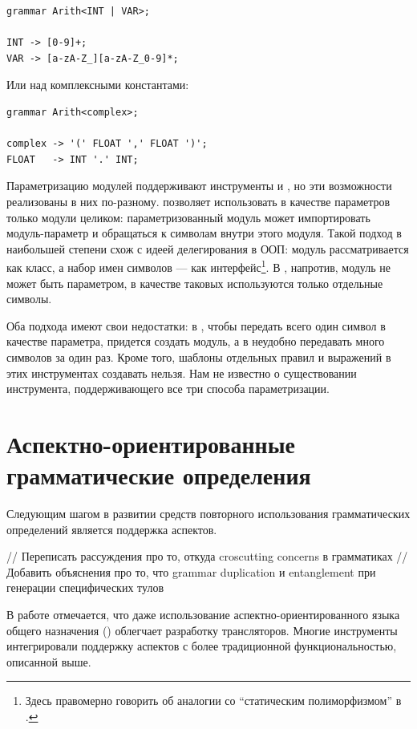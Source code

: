 \begin{lstlisting}
grammar Arith<INT | VAR>;

INT -> [0-9]+;
VAR -> [a-zA-Z_][a-zA-Z_0-9]*;
\end{lstlisting}

Или над комплексными константами:

\begin{lstlisting}
grammar Arith<complex>;

complex -> '(' FLOAT ',' FLOAT ')';
FLOAT   -> INT '.' INT;
\end{lstlisting}

Параметризацию модулей поддерживают инструменты  и , но эти возможности реализованы в них по-разному.  позволяет использовать в качестве параметров только модули целиком: параметризованный модуль может импортировать модуль-параметр и обращаться к символам внутри этого модуля. Такой подход в наибольшей степени схож с идеей делегирования в ООП: модуль рассматривается как класс, а набор имен символов --- как интерфейс\footnote{Здесь правомерно говорить об аналогии со ``статическим полиморфизмом'' в  \cite{C++}.}. В , напротив, модуль не может быть параметром, в качестве таковых используются только отдельные символы. 

Оба подхода имеют свои недостатки: в , чтобы передать всего один символ в качестве параметра, придется создать модуль, а в  неудобно передавать много символов за один раз. Кроме того, шаблоны отдельных правил и выражений в этих инструментах создавать нельзя. Нам не известно о существовании инструмента, поддерживающего все три способа параметризации.
	
\section{Аспектно-ориентированные грамматические определения}

Следующим шагом в развитии средств повторного использования грамматических определений является поддержка аспектов.

// Переписать рассуждения про то, откуда croscutting concerns в грамматиках
// Добавить объяснения про то, что grammar duplication и entanglement при генерации специфических тулов

В работе \cite{Wu06} отмечается, что даже использование аспектно-ориентированного языка общего назначения () облегчает разработку трансляторов. Многие инструменты интегрировали поддержку аспектов с более традиционной функциональностью, описанной выше.

